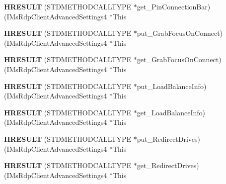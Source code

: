 \begin{DoxyCompactItemize}
{\bfseries H\+R\+E\+S\+U\+LT} (S\+T\+D\+M\+E\+T\+H\+O\+D\+C\+A\+L\+L\+T\+Y\+PE $\ast$get\+\_\+\+Pin\+Connection\+Bar)(I\+Ms\+Rdp\+Client\+Advanced\+Settings4 $\ast$This
\item 
\mbox{\label{struct_i_ms_rdp_client_advanced_settings4_vtbl_a3424d1718563a2d45b4a468d912c0de5}} 
{\bfseries H\+R\+E\+S\+U\+LT} (S\+T\+D\+M\+E\+T\+H\+O\+D\+C\+A\+L\+L\+T\+Y\+PE $\ast$put\+\_\+\+Grab\+Focus\+On\+Connect)(I\+Ms\+Rdp\+Client\+Advanced\+Settings4 $\ast$This
\item 
\mbox{\label{struct_i_ms_rdp_client_advanced_settings4_vtbl_a4173298deecb7a0cf84dace6ea488ffa}} 
{\bfseries H\+R\+E\+S\+U\+LT} (S\+T\+D\+M\+E\+T\+H\+O\+D\+C\+A\+L\+L\+T\+Y\+PE $\ast$get\+\_\+\+Grab\+Focus\+On\+Connect)(I\+Ms\+Rdp\+Client\+Advanced\+Settings4 $\ast$This
\item 
\mbox{\label{struct_i_ms_rdp_client_advanced_settings4_vtbl_aea3790625419bc3ed3a4c10bb93dd471}} 
{\bfseries H\+R\+E\+S\+U\+LT} (S\+T\+D\+M\+E\+T\+H\+O\+D\+C\+A\+L\+L\+T\+Y\+PE $\ast$put\+\_\+\+Load\+Balance\+Info)(I\+Ms\+Rdp\+Client\+Advanced\+Settings4 $\ast$This
\item 
\mbox{\label{struct_i_ms_rdp_client_advanced_settings4_vtbl_aca7b740795764058631da2731fe28bd1}} 
{\bfseries H\+R\+E\+S\+U\+LT} (S\+T\+D\+M\+E\+T\+H\+O\+D\+C\+A\+L\+L\+T\+Y\+PE $\ast$get\+\_\+\+Load\+Balance\+Info)(I\+Ms\+Rdp\+Client\+Advanced\+Settings4 $\ast$This
\item 
\mbox{\label{struct_i_ms_rdp_client_advanced_settings4_vtbl_a665a1315d2eee4d3fba6383359acadfb}} 
{\bfseries H\+R\+E\+S\+U\+LT} (S\+T\+D\+M\+E\+T\+H\+O\+D\+C\+A\+L\+L\+T\+Y\+PE $\ast$put\+\_\+\+Redirect\+Drives)(I\+Ms\+Rdp\+Client\+Advanced\+Settings4 $\ast$This
\item 
\mbox{\label{struct_i_ms_rdp_client_advanced_settings4_vtbl_a30b7ac330d0b8023a87af0b2d53428a6}} 
{\bfseries H\+R\+E\+S\+U\+LT} (S\+T\+D\+M\+E\+T\+H\+O\+D\+C\+A\+L\+L\+T\+Y\+PE $\ast$get\+\_\+\+Redirect\+Drives)(I\+Ms\+Rdp\+Client\+Advanced\+Settings4 $\ast$This

\end{DoxyCompactItemize}
